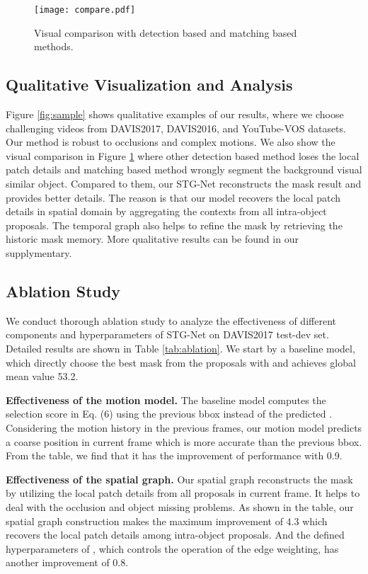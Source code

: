 \documentclass[letterpaper]{article} \usepackage{aaai21}  \usepackage{times}  \usepackage{helvet} \usepackage{courier}  \usepackage[hyphens]{url}  \usepackage{graphicx} \urlstyle{rm} \def\UrlFont{\rm}  \usepackage{graphicx}  \usepackage{natbib}  \usepackage{caption} \frenchspacing  \setlength{\pdfpagewidth}{8.5in}  \setlength{\pdfpageheight}{11in}  \usepackage{amsmath}
\begin{document}
\begin{figure}[t]
\centering
\texttt{[image: compare.pdf]}
\caption{Visual comparison with detection based \cite{luiten2018premvos} and matching based \cite{voigtlaender2019feelvos} methods.}
\label{fig:compare}
\vspace{-12pt}
\end{figure}

\subsection{Qualitative Visualization and Analysis}
Figure \ref{fig:sample} shows qualitative examples of our results, where we choose challenging videos from DAVIS2017, DAVIS2016, and YouTube-VOS datasets. Our method is robust to occlusions and complex motions. We also show the visual comparison in Figure \ref{fig:compare} where other detection based method loses the local patch details and matching based method wrongly segment the background visual similar object. Compared to them, our STG-Net reconstructs the mask result and provides better details. The reason is that our model recovers the local patch details in spatial domain by aggregating the contexts from all intra-object proposals. The temporal graph also helps to refine the mask by retrieving the historic mask memory. More qualitative results can be found in our supplymentary.

\subsection{Ablation Study}
We conduct thorough ablation study to analyze the effectiveness of different components and hyperparameters of STG-Net on DAVIS2017 test-dev set. Detailed results are shown in Table \ref{tab:ablation}. We start by a baseline model, which directly choose the best mask from the proposals with  and achieves global mean value 53.2. 

\noindent \textbf{Effectiveness of the motion model.}
The baseline model computes the selection score in Eq. (6) using the previous bbox instead of the predicted .
Considering the motion history in the previous frames, our motion model predicts a coarse position  in current frame which is more accurate than the previous bbox. From the table, we find that it has the improvement of performance with 0.9.

\noindent \textbf{Effectiveness of the spatial graph.}
Our spatial graph reconstructs the mask by utilizing the local patch details from all proposals in current frame. It helps to deal with the occlusion and object missing problems. As shown in the table, our spatial graph construction makes the maximum improvement of 4.3 which recovers the local patch details among intra-object proposals. And the defined hyperparameters of , which controls the operation of the edge weighting, has another improvement of 0.8.
\end{document}
